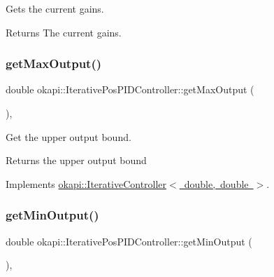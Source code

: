 Gets the current gains.

\begin{DoxyReturn}{Returns}
The current gains. 
\end{DoxyReturn}
\mbox{\label{classokapi_1_1IterativePosPIDController_a71538d55cd0a98812a749af84f8ec7aa}} 
\subsubsection{\texorpdfstring{getMaxOutput()}{getMaxOutput()}}
{\footnotesize\ttfamily double okapi\+::\+Iterative\+Pos\+P\+I\+D\+Controller\+::get\+Max\+Output (\begin{DoxyParamCaption}{ }\end{DoxyParamCaption})\hspace{0.3cm}{\ttfamily [override]}, {\ttfamily [virtual]}}

Get the upper output bound.

\begin{DoxyReturn}{Returns}
the upper output bound 
\end{DoxyReturn}


Implements \mbox{\hyperlink{classokapi_1_1IterativeController_a09bdba3a6d7854d943ed5401210b0595}{okapi\+::\+Iterative\+Controller$<$ double, double $>$}}.

\mbox{\label{classokapi_1_1IterativePosPIDController_a51666c20236a2a9ff87e843cf746833e}} 
\subsubsection{\texorpdfstring{getMinOutput()}{getMinOutput()}}
{\footnotesize\ttfamily double okapi\+::\+Iterative\+Pos\+P\+I\+D\+Controller\+::get\+Min\+Output (\begin{DoxyParamCaption}{ }\end{DoxyParamCaption})\hspace{0.3cm}{\ttfamily [override]}, {\ttfamily [virtual]}}

